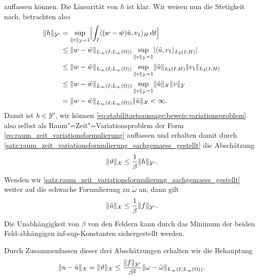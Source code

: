 \documentclass[../main.tex]{subfiles}
\begin{document}
\begin{Lemma}
\begin{Beweis}
\begin{equation}
        \end{equation}
        auffassen können.
        Die Linearität von $h$ ist klar.
        Wir weisen nun die Stetigkeit nach, betrachten also
        \begin{align}
            \norm{h}_{\mathcal Y'}
            &= \sup_{\norm{v}_{\mathcal Y} = 1} \abs[\Big]{\int_{I} \skp{(w - \tilde{w})\tilde{u}}{v_{1}}{H} \diff t}
            \\&\leq \norm{w - \tilde{w}}_{L_{\infty}(I; L_{\infty}(\Omega))} \sup_{\norm{v}_{\mathcal Y} = 1} \abs{\skp{\tilde{u}}{v_{1}}{L_{2}(I; H)}}
            \\&\leq \norm{w - \tilde{w}}_{L_{\infty}(I; L_{\infty}(\Omega))} \sup_{\norm{v}_{\mathcal Y} = 1} \norm{\tilde{u}}_{L_{2}(I; H)} \norm{v_{1}}_{L_{2}(I; H)}
            \\&\leq \norm{w - \tilde{w}}_{L_{\infty}(I; L_{\infty}(\Omega))} \sup_{\norm{v}_{\mathcal Y} = 1} \norm{\tilde{u}}_{\mathcal X} \norm{v}_{\mathcal Y}
            \\&= \norm{w - \tilde{w}}_{L_{\infty}(I; L_{\infty}(\Omega))} \norm{\tilde{u}}_{\mathcal X}
            < \infty.
        \end{align}
        Damit ist $h \in \mathcal Y'$, wir können \cref{eq:stabilitaetsaussage:beweis:variationsproblem} also selbst als Raum"=Zeit"=Variationsproblem der Form \cref{eq:raum_zeit_variationsformulierung} auffassen und erhalten damit durch \cref{satz:raum_zeit_variationsformulierung_sachgemaess_gestellt} die Abschätzung
        \begin{equation}
            \norm{\theta}_{\mathcal X} \leq \frac{1}{\beta} \norm{h}_{\mathcal Y'}.
        \end{equation}
        Wenden wir \cref{satz:raum_zeit_variationsformulierung_sachgemaess_gestellt} weiter auf die schwache Formulierung zu $\tilde{\omega}$ an, dann gilt
        \begin{equation}
            \norm{\tilde{u}}_{\mathcal X} \leq \frac{1}{\beta} \norm{f}_{\mathcal Y'}.
        \end{equation}
        Die Unabhängigkeit von $\beta$ von den Feldern kann durch das Minimum der beiden Feld-abhängigen inf-sup-Konstanten sichergestellt werden.

        Durch Zusammenfassen dieser drei Abschätzungen erhalten wir die Behauptung
        \begin{equation}
            \norm{u - \tilde{u}}_{\mathcal X} = \norm{\theta}_{\mathcal X} \leq \frac{\norm{f}_{\mathcal Y'}}{\beta^{2}} \norm{\omega - \tilde{\omega}}_{L_{\infty}(I; L_{\infty}(\Omega))}.
        \end{equation}
    \end{Beweis}
\end{Lemma}
\end{document}
